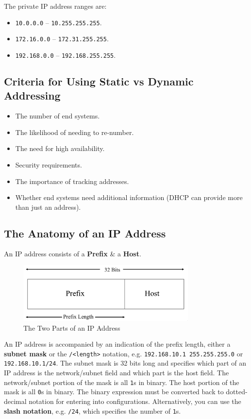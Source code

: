 \documentclass[a4paper,11pt]{article}
\begin{document}
The private IP address ranges are:
\begin{itemize}
    \item   \verb|10.0.0.0| -- \verb|10.255.255.255|.
    \item   \verb|172.16.0.0| -- \verb|172.31.255.255|.
    \item   \verb|192.168.0.0| -- \verb|192.168.255.255|.
\end{itemize}

\subsection{Criteria for Using Static vs Dynamic Addressing}
\begin{itemize}
    \item   The number of end systems.
    \item   The likelihood of needing to re-number.
    \item   The need for high availability.
    \item   Security requirements.
    \item   The importance of tracking addresses.
    \item   Whether end systems need additional information (DHCP can provide more than just an address).
\end{itemize}

\subsection{The Anatomy of an IP Address}
An IP address consists of a \textbf{Prefix} \& a \textbf{Host}.
\begin{figure}[H]
    \centering
    \includegraphics[width=0.8\textwidth]{./images/ipaddr_anatomy.png}
    \caption{The Two Parts of an IP Address}
\end{figure}

An IP address is accompanied by an indication of the prefix length, either a \textbf{subnet mask} or the \verb|/<length>|
notation, e.g. \verb|192.168.10.1 255.255.255.0| or \verb|192.168.10.1/24|.
The subnet mask is 32 bits long and specifies which part of an IP address is the network/subnet field and which part is the 
host field. 
The network/subnet portion of the mask is all \verb|1|s in binary.
The host portion of the mask is all \verb|0|s in binary.
The binary expression must be converted back to dotted-decimal notation for entering into configurations.
Alternatively, you can use the \textbf{slash notation}, e.g. \verb|/24|, which specifies the number of \verb|1|s.
\end{document}
